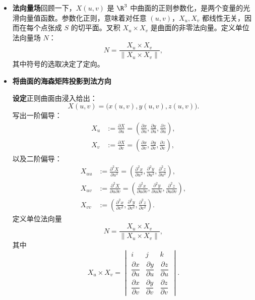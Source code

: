 \begin{itemize}
  \item \textbf{法向量场}\quad 回顾一下，$X(u,v)$ 是 $\R^3$ 中曲面的正则参数化，是两个变量的光滑向量值函数。参数化正则，意味着对任意 $(u,v)$，$X_u,X_v$ 都线性无关，因而在每个点张成 $S$ 的切平面。叉积 $X_u\times X_v$ 是曲面的非零法向量。定义单位法向量场 $N$：
  \[
    N=\frac{X_u\times X_v}{\lVert X_u\times X_v\rVert},
  \]
  其中符号的选取决定了定向。
  \item \textbf{将曲面的海森矩阵投影到法方向}

  \textbf{设定}\quad 正则曲面由浸入给出：
  \[
    X(u,v)=\bigl(x(u,v),y(u,v),z(u,v)\bigr).
  \]
  写出一阶偏导：
  \[
    \begin{aligned}
      X_u&:=\frac{\partial X}{\partial u}
        =\left(\frac{\partial x}{\partial u},\frac{\partial y}{\partial u},
                \frac{\partial z}{\partial u}\right),\\
      X_v&:=\frac{\partial X}{\partial v}
        =\left(\frac{\partial x}{\partial v},\frac{\partial y}{\partial v},
                \frac{\partial z}{\partial v}\right),
    \end{aligned}
  \]
  以及二阶偏导：
  \[
    \begin{aligned}
      X_{uu}&:=\frac{\partial^2X}{\partial u^2}
        =\left(\frac{\partial^2x}{\partial u^2},\frac{\partial^2y}{\partial u^2},
                \frac{\partial^2z}{\partial u^2}\right),\\
      X_{uv}&:=\frac{\partial^2X}{\partial u\partial v}
        =\left(\frac{\partial^2x}{\partial u\partial v},
                \frac{\partial^2y}{\partial u\partial v},
                \frac{\partial^2z}{\partial u\partial v}\right),\\
      X_{vv}&:=\left(\frac{\partial^2x}{\partial v^2},
                \frac{\partial^2y}{\partial v^2},\frac{\partial^2z}{\partial v^2}\right).
    \end{aligned}
  \]
  定义单位法向量
  \[
    N=\frac{X_u\times X_v}{\lVert X_u\times X_v\rVert},
  \]
  其中
  \[
    X_u\times X_v=
    \begin{vmatrix}
      i&j&k\\[2pt]
      \dfrac{\partial x}{\partial u}&\dfrac{\partial y}{\partial u}&\dfrac{\partial z}{\partial u}\\[6pt]
      \dfrac{\partial x}{\partial v}&\dfrac{\partial y}{\partial v}&\dfrac{\partial z}{\partial v}
    \end{vmatrix}.
  \]
\end{itemize}

